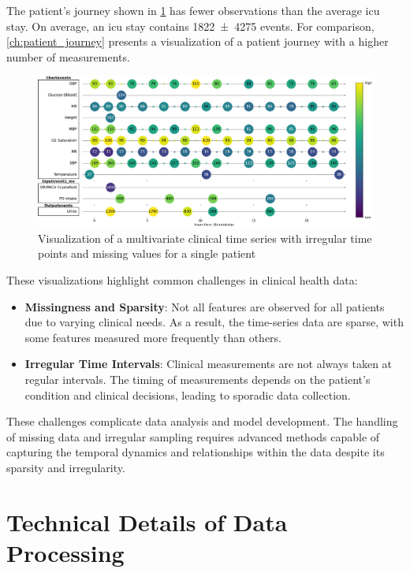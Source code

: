 The patient's journey shown in \cref{fig:journey_292741} has fewer observations than the average \gls{icu} stay. On average, an \gls{icu} stay contains \num{1822(4275)} events. For comparison, \cref{ch:patient_journey} presents a visualization of a patient journey with a higher number of measurements.

\begin{figure}
    \centering
    \includegraphics[height=\textheight, width=\textwidth, keepaspectratio]{./figures/journey_292741}
    \caption{Visualization of a multivariate clinical time series with irregular time points and missing values for a single patient}
    \label{fig:journey_292741}
\end{figure}

These visualizations highlight common challenges in clinical health data:

\begin{itemize}
    \item \textbf{Missingness and Sparsity}: Not all features are observed for all patients due to varying clinical needs. As a result, the time-series data are sparse, with some features measured more frequently than others.
    \item \textbf{Irregular Time Intervals}: Clinical measurements are not always taken at regular intervals. The timing of measurements depends on the patient's condition and clinical decisions, leading to sporadic data collection.
\end{itemize}

These challenges complicate data analysis and model development. The handling of missing data and irregular sampling requires advanced methods capable of capturing the temporal dynamics and relationships within the data despite its sparsity and irregularity.


\section{Technical Details of Data Processing}

